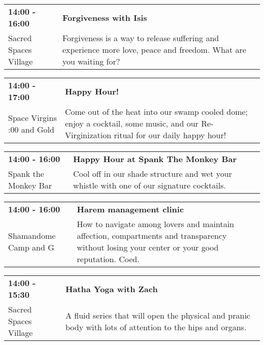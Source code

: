\begin{tabular}{ p{1in} p{2.2in} }
    \textbf{14:00 - 16:00} & \textbf{Forgiveness with Isis} \\
    Sacred Spaces Village \newline  & Forgiveness is a way to release suffering and experience more love, peace and freedom. What are you waiting for? \\
    \hline 
\end{tabular}
    
\begin{tabular}{ p{1in} p{2.2in} }
    \textbf{14:00 - 17:00} & \textbf{Happy Hour!} \\
    Space Virgins \newline 6:00 and Gold & Come out of the heat into our swamp cooled dome; enjoy a cocktail, some music, and our Re-Virginization ritual for our daily happy hour! \\
    \hline 
\end{tabular}
    
\begin{tabular}{ p{1in} p{2.2in} }
    \textbf{14:00 - 16:00} & \textbf{Happy Hour at Spank The Monkey Bar} \\
    Spank the Monkey Bar \newline  & Cool off in our shade structure and wet your whistle with one of our signature cocktails. \\
    \hline 
\end{tabular}
    
\begin{tabular}{ p{1in} p{2.2in} }
    \textbf{14:00 - 16:00} & \textbf{Harem management clinic} \\
    Shamandome Camp \newline 615 and G & How to navigate among lovers and maintain affection, compartments and transparency without losing your center or your good reputation. Coed. \\
    \hline 
\end{tabular}
    
\begin{tabular}{ p{1in} p{2.2in} }
    \textbf{14:00 - 15:30} & \textbf{Hatha Yoga with Zach} \\
    Sacred Spaces Village \newline  & A fluid series that will open the physical and pranic body with lots of attention to the hips and organs. \\
    \hline 
\end{tabular}
    

